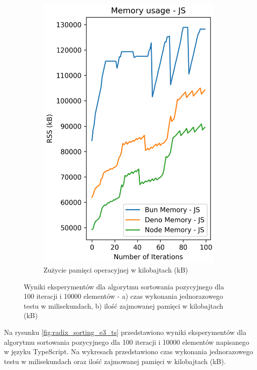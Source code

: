 \begin{figure}[H]
\begin{subfigure}[b]{0.42\textwidth}
    \includegraphics[width=\textwidth]{Figures/sorting/sorting_radix_100_10000_js_memory.png}
    \caption{Zużycie pamięci operacyjnej w kilobajtach (kB)}
    \label{fig:radix_sorting_e3_memory}
  \end{subfigure}
  \caption{Wyniki eksperymentów dla algorytmu sortowania pozycyjnego dla 100 iteracji i 10000 elementów - a) czas wykonania jednorazowego testu w milisekundach, b) ilość zajmowanej pamięci w kilobajtach (kB)}
  \label{fig:radix_sorting_e3}
\end{figure}

Na rysunku \ref{fig:radix_sorting_e3_ts} przedstawiono wyniki eksperymentów dla algorytmu sortowania pozycyjnego dla 100 iteracji i 10000 elementów napisanego w języku TypeScript. Na wykresach przedstawiono czas wykonania jednorazowego testu w milisekundach oraz ilość zajmowanej pamięci w kilobajtach (kB).

